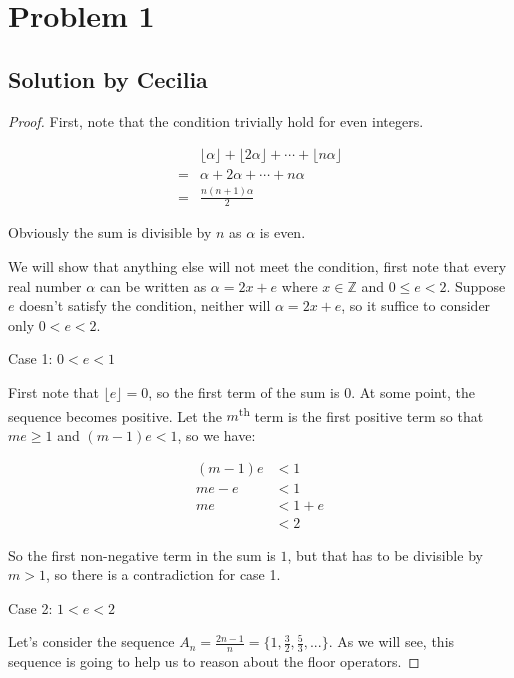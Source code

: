 \section*{Problem 1}

\subsection*{Solution by Cecilia}

\begin{proof}

First, note that the condition trivially hold for even integers.

\begin{align*}
   & \lfloor \alpha \rfloor + \lfloor 2 \alpha \rfloor + \cdots + \lfloor n \alpha \rfloor \\
  =& \alpha + 2\alpha + \cdots + n\alpha                                                   \\
  =& \frac{n(n+1)\alpha}{2}
\end{align*}

Obviously the sum is divisible by $ n $ as $ \alpha $ is even.

We will show that anything else will not meet the condition, first note that every real number $ \alpha $ can be written as $ \alpha = 2x + e $ where $ x \in \mathbb{Z} $ and $ 0 \le e < 2 $. Suppose $ e $ doesn't satisfy the condition, neither will $ \alpha = 2x + e $, so it suffice to consider only $ 0 < e < 2 $.

Case 1: $ 0 < e < 1 $

First note that $ \lfloor e \rfloor = 0 $, so the first term of the sum is $ 0 $. At some point, the sequence becomes positive. Let the $ m $\textsuperscript{th} term is the first positive term so that $ me \ge 1 $ and $ (m-1)e < 1 $, so we have:

\begin{align*}
  (m-1)e &< 1     \\
  me - e &< 1     \\
      me &< 1 + e \\
         &< 2
\end{align*}

So the first non-negative term in the sum is $ 1 $, but that has to be divisible by $ m > 1 $, so there is a contradiction for case 1.

Case 2: $ 1 < e < 2 $

Let's consider the sequence $ A_n = \frac{2n - 1}{n} = \{1, \frac{3}{2}, \frac{5}{3}, ...\} $. As we will see, this sequence is going to help us to reason about the floor operators.


\end{proof}
